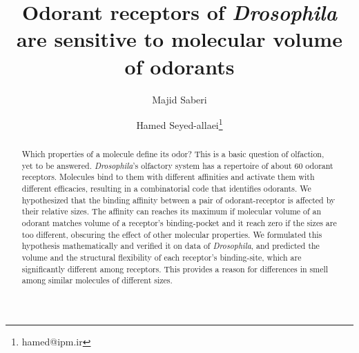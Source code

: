 \documentclass[11pt]{paper} %
\title{Odorant receptors of \textit{Drosophila} are sensitive to molecular volume of odorants}
\author{Majid Saberi \and Hamed Seyed-allaei\thanks{hamed@ipm.ir}}
\begin{document}

\maketitle

\begin{abstract} 
Which properties of a molecule define its odor? This is a basic question of olfaction, 
yet to be answered. \textit{Drosophila}'s olfactory system has a repertoire of about 60 odorant receptors. 
Molecules bind to them with different affinities and activate them with different efficacies, 
resulting in a combinatorial code that identifies odorants. 
We hypothesized that the binding affinity between a pair of odorant-receptor is affected by their relative sizes. 
The affinity can reaches its maximum if molecular volume of an odorant matches volume of a receptor's binding-pocket 
and it reach zero if the sizes are too different, 
obscuring the effect of other molecular properties. 
We formulated this hypothesis mathematically and verified it on data of \textit{Drosophila}, 
and predicted the volume and the structural flexibility of each receptor's binding-site, 
which are significantly different among receptors. 
This provides a reason for differences in smell among similar molecules of different sizes. 
\end{abstract}



\end{document}
